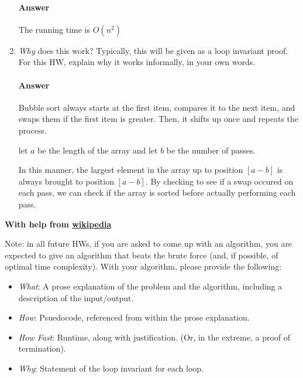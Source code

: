 \documentclass{article}
\begin{document}
\begin{enumerate}
            \paragraph{Answer} The running time is $O(n^2)$
            
      \item \emph{Why} does this work? Typically, this will be given as a loop
            invariant proof.  For this HW, explain why it works informally, in your
            own words.
            
            \paragraph{Answer}
            Bubble sort always starts at the first item, compares it to the next item,
            and swaps them if the first item is greater. Then, it shifts up once and repeats
            the process. 
            
            let $a$ be the length of the array and let $b$ be the number of passes.
            
            In this manner, the largest element in the array up to position $[a-b]$ is always brought
            to position $[a - b]$. By checking to see if a swap occured on each pass, we can check 
            if the array is sorted before actually performing each pass.
            
\end{enumerate}

{\bf With help from \href{https://en.wikipedia.org/wiki/Bubble_sort}{wikipedia}}

Note: in all future HWs, if you are asked to come up with an algorithm, you are
expected to give an algorithm that beats the brute force (and, if possible, of
optimal time complexity). With your algorithm, please provide the following:
\begin{itemize}
      \item \emph{What}: A prose explanation of the problem and the algorithm,
            including a description of the input/output.
      \item \emph{How}: Psuedocode, referenced from within the prose explanation.
      \item \emph{How Fast}: Runtime, along with justification.  (Or, in the
            extreme, a proof of termination).
      \item \emph{Why}: Statement of the loop invariant for each loop.
\end{itemize}
\end{document}
